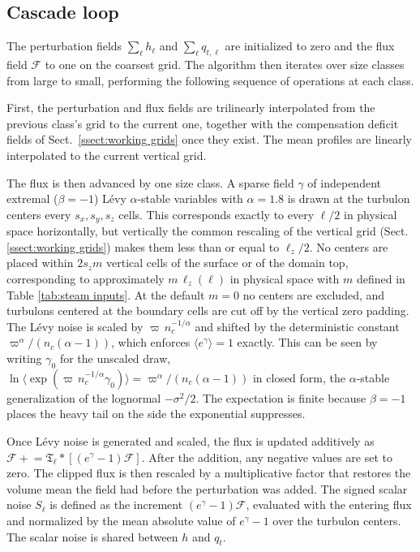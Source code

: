 \documentclass{article}
\begin{document}
\subsection{Cascade loop}

The perturbation fields $\sum_\ell h_\ell$ and $\sum_\ell q_{t,\ell}$ are
initialized to zero and the flux field $\mathcal{F}$ to one on the
coarsest grid. The algorithm then iterates over size classes from large
to small, performing the following sequence of operations at each class.

First, the perturbation and flux fields are trilinearly interpolated
from the previous class's grid to the current one, together with the
compensation deficit fields of Sect.~\ref{ssect:working grids} once
they exist. The mean profiles are linearly interpolated to the current
vertical grid. 

The flux is then advanced by one size class. A sparse field $\gamma$ of
independent extremal ($\beta = -1$) L\'evy $\alpha$-stable variables with
$\alpha = 1.8$ is drawn at the turbulon centers every $s_x, s_y, s_z$
cells. This corresponds exactly to every $\ell/2$ in physical space horizontally, but vertically the common rescaling of the
vertical grid (Sect. \ref{ssect:working grids}) makes them less than or equal to
$\ell_z/2$. No centers are placed within $2 s_z m$ vertical cells of the
surface or of the domain top, corresponding to approximately $m\, \ell_z(\ell)$ in physical space with $m$
defined in Table \ref{tab:steam inputs}. At the default $m = 0$ no centers are
excluded, and turbulons centered at the boundary cells are cut off by the
vertical zero padding. The L\'evy noise is scaled by
$\varpi\, n_c^{-1/\alpha}$ and shifted by the deterministic
constant $\varpi^\alpha/(n_c(\alpha-1))$, which enforces $\langle
e^\gamma \rangle = 1$ exactly. This can be seen by writing $\gamma_0$ for the unscaled
draw, $\ln\langle \exp(\varpi\, n_c^{-1/\alpha}\gamma_0) \rangle =
\varpi^\alpha/(n_c(\alpha-1))$ in closed form, the $\alpha$-stable
generalization of the lognormal $-\sigma^2/2$. The expectation is
finite because $\beta = -1$ places the heavy tail on the side the
exponential suppresses. 

Once L\'evy noise is generated and scaled, the flux is updated additively as
$\mathcal{F} \mathrel{+}= \mathfrak{T}_\ell * [(e^\gamma - 1)\mathcal{F}]$. After the addition, any negative values are set to zero. The clipped flux is then rescaled by a multiplicative factor that restores the volume
mean the field had before the perturbation was added.
The signed scalar noise $S_\ell$ is defined as the increment $(e^\gamma -
1)\mathcal{F}$, evaluated with the entering flux and normalized by the mean
absolute value of $e^\gamma - 1$ over the turbulon centers. The scalar noise is shared
between $h$ and $q_t$.
\end{document}

